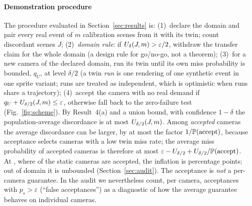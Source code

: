 

\paragraph{Demonstration procedure} The procedure evaluated in Section~\ref{sec:results} is: (1)~declare the domain and
pair every real event of $m$ calibration scenes from it with its twin; count discordant scenes $J$; (2)~\emph{domain rule}:
if $U_\delta(J,m)>\varepsilon/2$, withdraw the transfer claim for the whole domain (a design rule for go/no-go, not a
theorem); (3)~for a new camera of the declared domain, run its twin until its own miss probability is bounded, $q_U$, at
level $\delta/2$ (a twin \emph{run} is one rendering of one synthetic event in one sprite variant; runs are treated as
independent, which is optimistic when runs share a trajectory); (4)~accept the camera with no real demand if $q_U+U_{\delta/2}(J,m)\le\varepsilon$, otherwise fall
back to the zero-failure test (Fig.~\ref{fig:scheme}). By Result~4(a) and a union bound, with confidence $1-\delta$ the population-average discordance is at most
$U_{\delta/2}(J,m)$. Among \emph{accepted} cameras the average discordance can be larger, by at most the factor
$1/\mathbb{P}(\mathrm{accept})$, because acceptance selects cameras with a low twin miss rate; the average miss probability of
accepted cameras is therefore at most $\varepsilon-U_{\delta/2}+U_{\delta/2}/\mathbb{P}(\mathrm{accept})$. At \OPs{}, where
\nPAccept{} of the static cameras are accepted, the inflation is \nAcceptInflation{} percentage points; out of domain it is
unbounded (Section~\ref{sec:audit}). The acceptance is \emph{not} a per-camera guarantee. In the audit we nevertheless count, per camera, acceptances with $p_s>\varepsilon$ (``false acceptances'') as a
diagnostic of how the average guarantee behaves on individual cameras.

